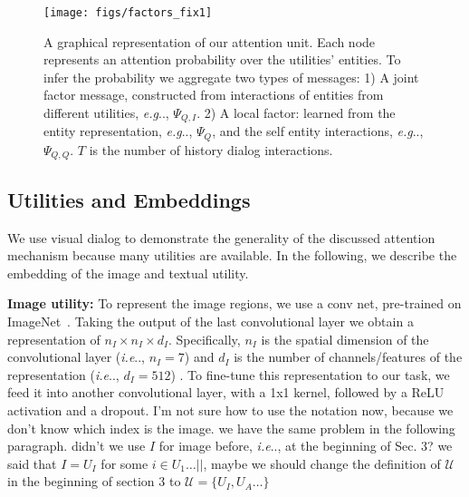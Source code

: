 \documentclass[10pt,twocolumn,letterpaper]{article}
\makeatletter
\newcommand{\alex}[1]{{\color{green}{Alex: #1}}}
\newcommand{\tamir}[1]{{\color{blue}{Tamir: #1}}}
\def\@onedot{\ifx\@let@token.\else.\null\fi\xspace}
\DeclareRobustCommand\onedot{\futurelet\@let@token\@onedot}
\def\eg{\emph{e.g}\onedot} \def\Eg{\emph{E.g}\onedot}
\def\ie{\emph{i.e}\onedot} \def\Ie{\emph{I.e}\onedot}
\makeatother
\begin{document}
\begin{figure}[t]

\centering
\texttt{[image: figs/factors\_fix1]}
\vspace{-0.7cm}
\caption[]{{\small A graphical representation of our attention unit. Each node represents an attention probability over the utilities' entities. To infer the probability we aggregate two types of messages: 1) A joint factor message, constructed from interactions of entities from different utilities, \eg, $ \Psi_{Q, I} $. 2) A local factor: learned from the entity representation, \eg, $ \Psi_Q $, and the self entity interactions, \eg, $ \Psi_{Q, Q} $. $ T $ is the number of history dialog interactions. }}
\label{fig:factors}
\vspace{-0.5cm}
\end{figure}







\iffalse

\subsection{Utilities and Embeddings}
\label{sec:modals}

We use visual dialog to demonstrate the generality of the discussed attention mechanism because many utilities are available. In the following, we describe the embedding of the image and textual utility. 

\noindent\textbf{Image utility:} 
To represent the image regions, we use a  conv net,  pre-trained on ImageNet~\cite{imagenet_cvpr09}. Taking the output of the last convolutional layer we obtain a representation  of $n_I \times n_I \times d_I$. Specifically, $n_I$ is the spatial dimension of the convolutional layer (\ie, $n_I = 7$) and $d_I$ is the number of channels/features of the representation (\ie, $d_I=512$) \tamir{there is an inconsistency with the previous definiction where $n_i = n_I^2$} \alex{I don't see that definition; where is it?}. To fine-tune this representation to our task, we feed it into another convolutional layer, with a 1x1 kernel, followed by a ReLU activation and a dropout.  
{\color{blue} I'm not sure how to use the notation now, because we don't know which index is the image. we have the same problem in the following paragraph.} {\color{green}didn't we use $I$ for image before, \ie, at the beginning of Sec. 3?} 
{\color{red} we said that $ I = U_I $ for some $i\in{U_1\ldots||}$, maybe we should change the definition of $ \mathcal{U} $ in the beginning of section 3 to $ \mathcal{U}=\{U_I, U_A \ldots\} $ }
\end{document}
